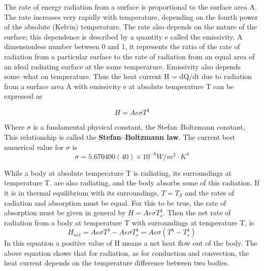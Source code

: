The rate of energy radiation from a surface is proportional to the surface area A. The rate increases very rapidly with temperature, depending on the fourth power of the absolute (Kelvin) temperature. The rate also depends on the nature of the surface; this dependence is described by a quantity e called the emissivity. A dimensionless number between 0 and 1, it represents the ratio of the rate of radiation from a particular surface to the rate of radiation from an equal area of an ideal radiating surface at the same temperature. Emissivity also depends some--what on temperature. Thus the heat current H = dQ/dt due to radiation from a surface area A with emissivity e at absolute temperature T can be expressed as
\begin{form}
$$H=Ae\sigma T^4$$
\end{form}
Where $\sigma$ is a fundamental physical constant, the Stefan--Boltzmann constant, This relationship is called the \textbf{Stefan--Boltzmann law}. The current best numerical value for $\sigma$ is
$$\sigma=5.670400(40)\times 10^{-8} W/m^2\cdot K^4$$

While a body at absolute temperature T is radiating, its surroundings at temperature T. are also radiating, and the body absorbs some of this radiation. If it is in thermal equilibrium with its surroundings, $T=T_S$ and the rates of radiation and absorption must be equal. For this to be true, the rate of absorption must be given in general by $H =Ae\sigma T_s^4$. Then the net rate of radiation from a body at temperature T with surroundings at temperature T, is
$$H_{net}=Ae\sigma T^4 - Ae\sigma  T_s^4=Ae\sigma\left(T^4-T_s^4\right)$$
In this equation a positive value of H means a net heat flow out of the body. The above equation shows that for radiation, as for conduction and convection, the heat current depends on the temperature difference between two bodies.